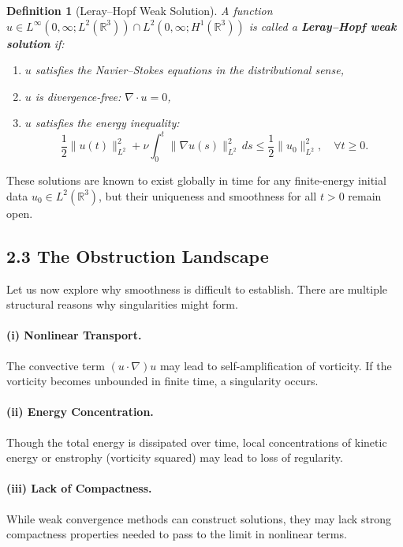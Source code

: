 \documentclass[11pt]{article}
\newtheorem{definition}[theorem]{Definition}
\begin{document}
\begin{definition}[Leray–Hopf Weak Solution]
A function \( u \in L^\infty(0,\infty; L^2(\mathbb{R}^3)) \cap L^2(0,\infty; H^1(\mathbb{R}^3)) \) is called a \textbf{Leray–Hopf weak solution} if:

\begin{enumerate}
  \item \( u \) satisfies the Navier–Stokes equations in the distributional sense,
  \item \( u \) is divergence-free: \( \nabla \cdot u = 0 \),
  \item \( u \) satisfies the energy inequality:
  \[
  \frac{1}{2} \|u(t)\|_{L^2}^2 + \nu \int_0^t \|\nabla u(s)\|_{L^2}^2 \, ds \le \frac{1}{2} \|u_0\|_{L^2}^2, \quad \forall t \ge 0.
  \]
\end{enumerate}
\end{definition}

These solutions are known to exist globally in time for any finite-energy initial data \( u_0 \in L^2(\mathbb{R}^3) \), but their uniqueness and smoothness for all \( t > 0 \) remain open.

\subsection{2.3 The Obstruction Landscape}

Let us now explore why smoothness is difficult to establish. There are multiple structural reasons why singularities might form.

\paragraph{(i) Nonlinear Transport.} The convective term \( (u \cdot \nabla)u \) may lead to self-amplification of vorticity. If the vorticity becomes unbounded in finite time, a singularity occurs.

\paragraph{(ii) Energy Concentration.} Though the total energy is dissipated over time, local concentrations of kinetic energy or enstrophy (vorticity squared) may lead to loss of regularity.

\paragraph{(iii) Lack of Compactness.} While weak convergence methods can construct solutions, they may lack strong compactness properties needed to pass to the limit in nonlinear terms.
\end{document}
